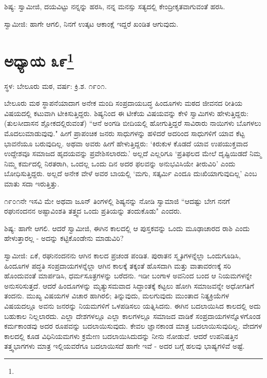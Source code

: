 ಶಿಷ್ಯ: ಸ್ವಾಮೀಜಿ, ದಯವಿಟ್ಟು ನನ್ನನ್ನು ಹರಸಿ, ನನ್ನ ಮನಸ್ಸು ಸತ್ಯದಲ್ಲಿ ಕೇಂದ್ರೀಕೃತವಾಗುವಂತೆ ಹರಸಿ.

ಸ್ವಾಮೀಜಿ: ಹಾಗೇ ಆಗಲಿ, ನಿನಗೆ ಉತ್ಕಟ ಆಕಾಂಕ್ಷೆ ಇದ್ದರೆ ಖಂಡಿತ ಆಗುವುದು.

\newpage

\chapter[ಅಧ್ಯಾಯ ೩೯]{ಅಧ್ಯಾಯ ೩೯\protect\footnote{}}

\centerline{ಸ್ಥಳ: ಬೇಲೂರು ಮಠ, ವರ್ಷ: ಕ್ರಿ.ಶ. ೧೯೦೧.}

ಬೇಲೂರು ಮಠ ಸ್ಥಾಪನೆಯಾದಾಗ ಅನೇಕ ಮಂದಿ ಸಂಪ್ರದಾಯಬದ್ಧ ಹಿಂದೂಗಳು ಮಠದ ಜೀವನದ ರೀತಿಯ ವಿಷಯದಲ್ಲಿ ಕಟುವಾಗಿ ಟೀಕಿಸುತ್ತಿದ್ದರು. ಶಿಷ್ಯನಿಂದ ಈ ಟೀಕೆಯ ವಿಷಯವನ್ನು ಕೇಳಿ ಸ್ವಾಮಿಗಳು ಹೇಳುತ್ತಿದ್ದರು: (ತುಲಸೀದಾಸನ ಶ್ಲೋಕದಲ್ಲಿರುವಂತೆ) “ಆನೆ ಅಂಗಡಿ ಬೀದಿಯಲ್ಲಿ ಹೋಗುತ್ತಿದ್ದರೆ ಸಾವಿರಾರು ನಾಯಿಗಳು ಬೊಗಳಲು ಮೊದಲುಮಾಡುವುವು." ಹೀಗೆ ಪ್ರಾಪಂಚಿಕ ಜನರು ಸಾಧುಗಳನ್ನು ಹಳಿದರೆ ಅದರಿಂದ ಸಾಧುಗಳಿಗೆ ಯಾವ ಕೆಟ್ಟ ಭಾವನೆಯೂ ಬರುವುದಿಲ್ಲ. ಅಥವಾ ಅವರು ಹೀಗೆ ಹೇಳುತ್ತಿದ್ದರು: ‘ಕಿರುಕುಳ ಕೊಡದೆ ಯಾವ ಉಪಯುಕ್ತವಾದ ಉದ್ದೇಶವೂ ಸಮಾಜದ ಹೃದಯವನ್ನು ಪ್ರವೇಶಿಸಲಾರದು.’ ಅಲ್ಲದೆ ಎಲ್ಲರಿಗೂ ‘ಪ್ರತಿಫಲದ ಮೇಲೆ ದೃಷ್ಟಿಯಿಡದೆ ನಿಮ್ಮ ನಿಮ್ಮ ಕರ್ಮದಲ್ಲಿ ನಿರತರಾಗಿ, ಒಂದಲ್ಲ ಒಂದು ದಿನ ಅದರ ಫಲವನ್ನು ಅನುಭವಿಸಿಯೇ ತೀರುವಿರಿ’ ಎಂದು ಬೋಧಿಸುತ್ತಿದ್ದರು. ಅಲ್ಲದೆ ಅನೇಕ ವೇಳೆ ಅವರ ಬಾಯಲ್ಲಿ ‘ಮಗು, ಸತ್ಕರ್ಮಿ ಎಂದೂ ದುಃಖಿಯಾಗುವುದಿಲ್ಲ’ ಎಂಬ ಮಾತು ಸದಾ ಇರುತ್ತಿತ್ತು.

೧೯೦೧ನೇ ಇಸವಿ ಮೇ ಅಥವಾ ಜೂನ್ ತಿಂಗಳಲ್ಲಿ ಶಿಷ್ಯನನ್ನು ನೋಡಿ ಸ್ವಾಮಾಜಿ “ಆದಷ್ಟು ಬೇಗ ನನಗೆ ರಘುನಂದನನ ಅಷ್ಟಾವಿಂಶತಿ ತತ್ತ್ವದ ಒಂದು ಪ್ರತಿಯನ್ನು ತಂದುಕೊಡು" ಎಂದರು.

ಶಿಷ್ಯ: ಹಾಗೇ ಆಗಲಿ. ಆದರೆ ಸ್ವಾಮೀಜಿ, ಈಗಿನ ಕಾಲದಲ್ಲಿ ಆ ಪುಸ್ತಕವನ್ನು ಒಂದು ಮೂಢಾಚಾರದ ರಾಶಿ ಎಂದು ಹೇಳುತ್ತಾರಲ್ಲ - ಅದನ್ನು ಕಟ್ಟಿಕೊಂಡೇನು ಮಾಡುವಿರಿ?

ಸ್ವಾಮೀಜಿ: ಏಕೆ, ರಘುನಂದನನು ಆಗಿನ ಕಾಲದ ಪ್ರಚಂಡ ಪಂಡಿತ. ಪುರಾತನ ಸ್ಮೃತಿಗಳನ್ನೆಲ್ಲಾ ಒಂದುಗೂಡಿಸಿ, ಹಿಂದೂಗಳ ಪದ್ಧತಿ ಸಂಪ್ರದಾಯಗಳನ್ನೆಲ್ಲಾ ಆಗಿನ ಕಾಲಕ್ಕೆ ತಕ್ಕಂತೆ ಹೊಸದಾಗಿ ಮತ್ತು ವಾತಾವರಣಕ್ಕೆ ಸರಿ ಹೊಂದುವಂತೆ ಮಾರ್ಪಡಿಸಿ, ಧರ್ಮಸೂತ್ರಗಳನ್ನು ಬರೆದನು. ಇಡೀ ಬಂಗಾಳ ಅವನಿಂದ ಬಂದ ಆ ನಿಯಮಗಳನ್ನೇ ಅನುಸರಿಸುತ್ತದೆ. ಆದರೆ ಹಿಂದೂಗಳನ್ನು ಮೃತ್ಯುಸಮವಾದ ಸಿದ್ಧಾಂತಕ್ಕೆ ಕಟ್ಟಲು ಹೋಗಿ ಸಮಾಜವನ್ನೇ ಅಧೋಗತಿಗೆ ತಂದನು. ಮುಖ್ಯ ವಿಷಯಗಳ ವಿಚಾರ ಹಾಗಿರಲಿ; ತಿನ್ನುವುದು, ಮಲಗುವುದು ಮುಂತಾದ ನಿತ್ಯಕ್ರಿಯೆಗಳ ವಿಷಯದಲ್ಲೂ ಅವನು ಜನರನ್ನು ನಿಯಮಗಳಿಗೆ ಒಳಪಡಿಸಲು ಯತ್ನಿಸಿದನು. ಈಗಿನ ಬದಲಾಯಿಸಿದ ಕಾಲದಲ್ಲಿ ಅದು ಬಹುಕಾಲ ನಿಲ್ಲಲಾರದು. ಎಲ್ಲಾ ದೇಶಗಳಲ್ಲೂ ಎಲ್ಲಾ ಕಾಲಗಳಲ್ಲೂ ಸಮಾಜದ ವಾಡಿಕೆ ಸಂಪ್ರದಾಯಗಳನ್ನೊಳಗೊಂಡ ಕರ್ಮಕಾಂಡವು ಅದರ ರೂಪವನ್ನು ಬದಲಾಯಿಸುವುದು. ಕೇವಲ ಜ್ಞಾನಕಾಂಡ ಮಾತ್ರ ಬದಲಾಯಿಸುವುದಿಲ್ಲ. ವೇದಗಳ ಕಾಲದಲ್ಲಿ ಕೂಡ ವಿಧಿನಿಯಮಗಳು ಕ್ರಮೇಣ ಬದಲಾಯಿಸಿದುದನ್ನು ನೀನು ನೋಡುವೆ. ಆದರೆ ಉಪನಿಷತ್ತಿನ ತತ್ತ್ವಭಾಗಗಳು ಮಾತ್ರ ಇಲ್ಲಿಯವರೆಗೂ ಬದಲಾಯಿಸದೆ ಹಾಗೇ ಇವೆ - ಅದರ ಬಗ್ಗೆ ಹಲವು ಭಾಷ್ಯಗಳಿವೆ ಅಷ್ಟೆ.

